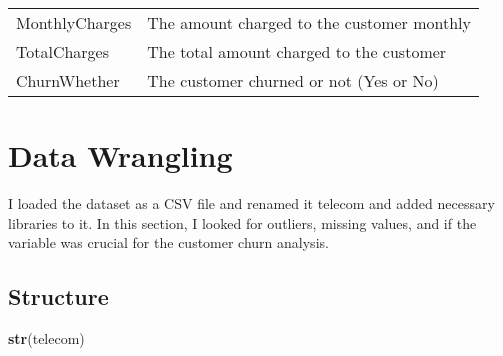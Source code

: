 \documentclass[]{article}
\newenvironment{Shaded}{\begin{snugshade}}{\end{snugshade}}
\newcommand{\KeywordTok}[1]{\textcolor[rgb]{0.13,0.29,0.53}{\textbf{#1}}}
\newcommand{\NormalTok}[1]{#1}
\begin{document}
\begin{longtable}[]{@{}ll@{}}
\begin{minipage}[t]{0.22\columnwidth}
MonthlyCharges\strut
\end{minipage} & \begin{minipage}[t]{0.72\columnwidth}\raggedright\strut
The amount charged to the customer monthly\strut
\end{minipage}\tabularnewline
\begin{minipage}[t]{0.22\columnwidth}\raggedright\strut
TotalCharges\strut
\end{minipage} & \begin{minipage}[t]{0.72\columnwidth}\raggedright\strut
The total amount charged to the customer\strut
\end{minipage}\tabularnewline
\begin{minipage}[t]{0.22\columnwidth}\raggedright\strut
ChurnWhether\strut
\end{minipage} & \begin{minipage}[t]{0.72\columnwidth}\raggedright\strut
The customer churned or not (Yes or No)\strut
\end{minipage}\tabularnewline
\bottomrule
\end{longtable}

\section{Data Wrangling}\label{data-wrangling}

I loaded the dataset as a CSV file and renamed it telecom and added
necessary libraries to it. In this section, I looked for outliers,
missing values, and if the variable was crucial for the customer churn
analysis.

\subsection{Structure}\label{structure}

\begin{Shaded}
\begin{Highlighting}[]
\KeywordTok{str}\NormalTok{(telecom)}
\end{Highlighting}
\end{Shaded}
\end{document}
